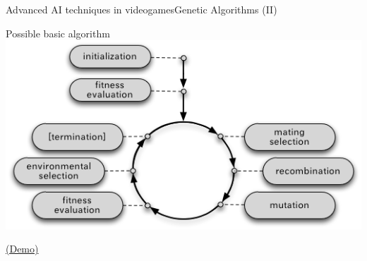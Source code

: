 \documentclass[10pt,compress]{beamer} %
\begin{document}
\begin{frame}{Advanced AI techniques in videogames}{Genetic Algorithms (II)} 
	\begin{center}
		Possible basic algorithm
		\includegraphics[width=0.75\linewidth]{figs/evolution.png}
	\end{center}
	\href{http://rednuht.org/genetic_cars_2/}{(Demo)}
\end{frame}
\end{document}
